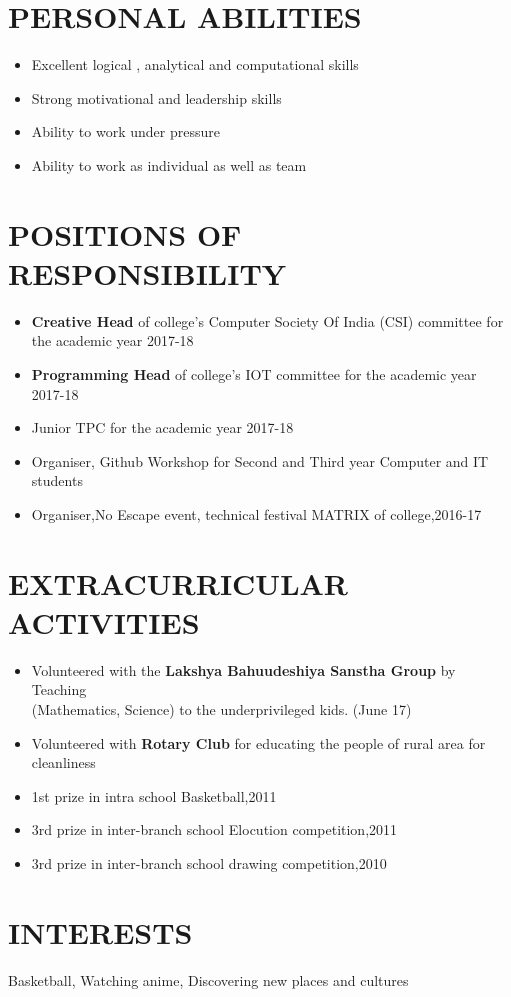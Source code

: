 \documentclass[11pt]{article} %
\newcommand{\NewPart}[1]{\section*{\uppercase{#1}}}
\begin{document}
 
 
\NewPart{    Personal Abilities}{}

\begin{itemize}
\itemsep-0.5em 
\item Excellent logical , analytical and computational skills
\item Strong motivational and leadership skills
\item Ability to work under pressure 
\item Ability to work as individual as well as team 
\end{itemize}

\NewPart{  Positions of Responsibility}{}

\begin{itemize}
\itemsep-0.5em 
\item \textbf{Creative Head} of college’s Computer Society Of India (CSI) committee for the academic year 2017-18
\item \textbf{Programming Head} of college’s IOT committee for the academic year 2017-18
\item Junior TPC for the academic year 2017-18
\item Organiser, Github Workshop for Second and Third year Computer and IT students 
\item Organiser,No Escape event, technical festival MATRIX of college,2016-17 
\end{itemize}
\NewPart{  Extracurricular Activities}{}

\begin{itemize}
\itemsep-0.5em 
	
\item Volunteered with the \textbf{Lakshya Bahuudeshiya Sanstha Group} by Teaching \\(Mathematics, Science) to the underprivileged kids. (June 17)
\item Volunteered with \textbf{Rotary Club} for educating the people of rural area for cleanliness
\item 1st prize in intra school Basketball,2011
\item 3rd prize in inter-branch school Elocution competition,2011
\item 3rd prize in inter-branch school drawing competition,2010
\end{itemize}

\NewPart{ Interests}{}
Basketball, Watching anime, Discovering new places and cultures
\end{document}
